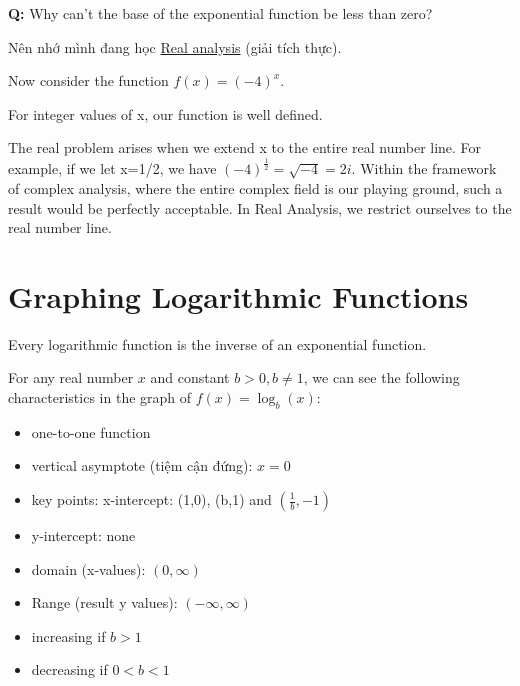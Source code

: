 \vspace{10 mm}

\textbf{Q:} Why can’t the base of the exponential function be less than zero?

Nên nhớ mình đang học \href{https://en.wikipedia.org/wiki/Real_analysis}{Real analysis} (giải tích thực).

Now consider the function \(f(x) = (-4)^{x}\).

For integer values of x, our function is well defined.

The real problem arises when we extend x to the entire real number line. For example, if we let x=1/2, we have \((-4)^{\frac{1}{2}}=\sqrt{-4}=2i\). Within the framework of complex analysis, where the entire complex field is our playing ground, such a result would be perfectly acceptable. In Real Analysis, we restrict ourselves to the real number line.

\section{Graphing Logarithmic Functions}

Every logarithmic function is the inverse of an exponential function.

For any real number $x$ and constant \(b>0, b\neq 1\), we can see the following characteristics in the graph of \(f(x)=\log_b(x)\):

\begin{itemize}
  \item one-to-one function
  \item vertical asymptote (tiệm cận đứng): \(x=0\)
  \item key points: x-intercept: (1,0), (b,1) and \((\frac{1}{b}, -1)\)
  \item y-intercept: none
  \item domain (x-values): \((0, \infty)\)
  \item Range (result y values): \((-\infty, \infty)\)
  \item increasing if \(b>1\)
  \item decreasing if \(0<b<1\)
\end{itemize}

